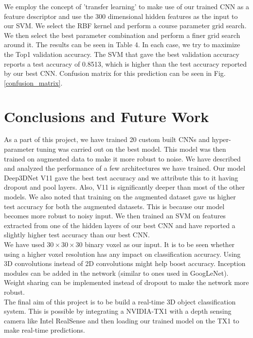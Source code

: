 \documentclass[10pt,twocolumn,letterpaper]{article}
\begin{document}
We employ the concept of 'transfer learning' to make use of our trained CNN as a feature descriptor and use the 300 dimensional hidden features as the input to our SVM. We select the RBF kernel and perform a course parameter grid search. We then select the best parameter combination and perform a finer grid search around it. The results can be seen in Table 4. In each case, we try to maximize the Top1 validation accuracy. The SVM that gave the best validation accuracy reports a test accuracy of 0.8513, which is higher than the test accuracy reported by our best CNN. Confusion matrix for this prediction can be seen in Fig. \ref{confusion_matrix}.



\section{Conclusions and Future Work}
As a part of this project, we have trained 20 custom built CNNs and hyper-parameter tuning was carried out on the best model. This model was then trained on augmented data to make it more robust to noise. We have described and analyzed the performance of a few architectures we have trained. Our model Deep3DNet V11 gave the best test accuracy and we attribute this to it having dropout and pool layers. Also, V11 is significantly deeper than most of the other models. We also noted that training on the augmented dataset gave us higher test accuracy for both the augmented datasets. This is because our model becomes more robust to noisy input. We then trained an SVM on features extracted from one of the hidden layers of our best CNN and have reported a slightly higher test accuracy than our best CNN.\\
We have used $30 \times 30 \times 30$ binary voxel as our input. It is to be seen whether using a higher voxel resolution has any impact on classification accuracy. Using 3D convolutions instead of 2D convolutions might help boost accuracy. Inception modules can be added in the network (similar to ones used in GoogLeNet). Weight sharing can be implemented instead of dropout to make the network more robust.\\
The final aim of this project is to be build a real-time 3D object classification system. This is possible by integrating a NVIDIA-TX1 with a depth sensing camera like Intel RealSense and then loading our trained model on the TX1 to make real-time predictions. 


{\small


}
\end{document}
